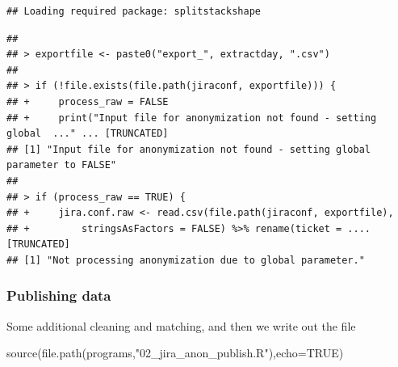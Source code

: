 \documentclass[
]{article}
\newenvironment{Shaded}{\begin{snugshade}}{\end{snugshade}}
\newcommand{\AttributeTok}[1]{\textcolor[rgb]{0.77,0.63,0.00}{#1}}
\newcommand{\ConstantTok}[1]{\textcolor[rgb]{0.00,0.00,0.00}{#1}}
\newcommand{\FunctionTok}[1]{\textcolor[rgb]{0.00,0.00,0.00}{#1}}
\newcommand{\NormalTok}[1]{#1}
\newcommand{\StringTok}[1]{\textcolor[rgb]{0.31,0.60,0.02}{#1}}
\begin{document}
\begin{verbatim}
## Loading required package: splitstackshape
\end{verbatim}

\begin{verbatim}
## 
## > exportfile <- paste0("export_", extractday, ".csv")
## 
## > if (!file.exists(file.path(jiraconf, exportfile))) {
## +     process_raw = FALSE
## +     print("Input file for anonymization not found - setting global  ..." ... [TRUNCATED] 
## [1] "Input file for anonymization not found - setting global parameter to FALSE"
## 
## > if (process_raw == TRUE) {
## +     jira.conf.raw <- read.csv(file.path(jiraconf, exportfile), 
## +         stringsAsFactors = FALSE) %>% rename(ticket = .... [TRUNCATED] 
## [1] "Not processing anonymization due to global parameter."
\end{verbatim}

\hypertarget{publishing-data}{%
\subsubsection{Publishing data}\label{publishing-data}}

Some additional cleaning and matching, and then we write out the file

\begin{Shaded}
\begin{Highlighting}[]
\FunctionTok{source}\NormalTok{(}\FunctionTok{file.path}\NormalTok{(programs,}\StringTok{"02\_jira\_anon\_publish.R"}\NormalTok{),}\AttributeTok{echo=}\ConstantTok{TRUE}\NormalTok{)}
\end{Highlighting}
\end{Shaded}
\end{document}
